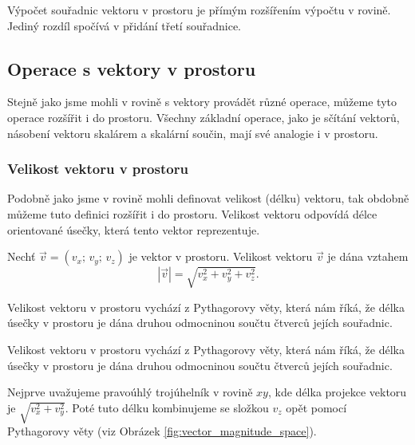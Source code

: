 \begin{remark}
    Výpočet souřadnic vektoru v prostoru je přímým rozšířením výpočtu v rovině.
    Jediný rozdíl spočívá v přidání třetí souřadnice.
\end{remark}



\subsection{Operace s vektory v prostoru}\label{subsec:Vector_operations_in_space}
Stejně jako jsme mohli v rovině s vektory provádět různé operace, můžeme tyto operace rozšířit i do prostoru.
Všechny základní operace, jako je sčítání vektorů, násobení vektoru skalárem a skalární součin, mají své analogie i v prostoru.



\subsubsection{Velikost vektoru v prostoru}\label{subsubsec:Vector_magnitude_in_space}

Podobně jako jsme v rovině mohli definovat velikost (délku) vektoru,
tak obdobně můžeme tuto definici rozšířit i do prostoru.
Velikost vektoru odpovídá délce orientované úsečky, která tento vektor reprezentuje.

\begin{definition}\label{def:vector_magnitude_space}
    Nechť $\vec{v} = (v_x;\, v_y;\, v_z)$ je vektor v prostoru.
    Velikost vektoru $\vec{v}$ je dána vztahem
    \begin{equation}\label{eq:vector_magnitude_space}
        |\vec{v}| = \sqrt{v_x^2 + v_y^2 + v_z^2}.
    \end{equation}
\end{definition}

Velikost vektoru v prostoru vychází z Pythagorovy věty, která nám říká, 
že délka úsečky v prostoru je dána druhou odmocninou součtu čtverců jejích souřadnic.

\begin{remark}
    Velikost vektoru v prostoru vychází z Pythagorovy věty, která nám říká, 
    že délka úsečky v prostoru je dána druhou odmocninou součtu čtverců jejích souřadnic.

    Nejprve uvažujeme pravoúhlý trojúhelník v rovině $xy$,
    kde délka projekce vektoru je $\sqrt{v_x^2 + v_y^2}$.
    Poté tuto délku kombinujeme se složkou $v_z$ opět pomocí Pythagorovy věty (viz Obrázek \ref{fig:vector_magnitude_space}).
\end{remark}


